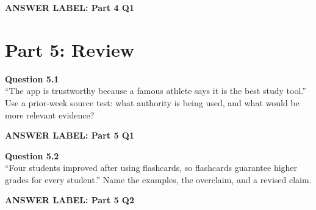 \documentclass[12pt]{article}
\newcommand{\answerbox}[2]{%
\vspace{0.15em}
\noindent\textbf{#1}\par
\vspace{0.05em}
\noindent\fbox{%
\begin{minipage}[t][#2]{\dimexpr\textwidth-2\fboxsep-2\fboxrule}
\rule{\textwidth}{0pt}
\vspace{#2}
\end{minipage}
}\par
\vspace{0.25em}
}
\begin{document}
\answerbox{ANSWER LABEL: Part 4 Q1}{3.2in}

\newpage

\section*{Part 5: Review}

\textbf{Question 5.1}\\[-0.15em]
``The app is trustworthy because a famous athlete says it is the best study tool.'' Use a prior-week source test: what authority is being used, and what would be more relevant evidence?

\answerbox{ANSWER LABEL: Part 5 Q1}{2.2in}

\textbf{Question 5.2}\\[-0.15em]
``Four students improved after using flashcards, so flashcards guarantee higher grades for every student.'' Name the examples, the overclaim, and a revised claim.

\answerbox{ANSWER LABEL: Part 5 Q2}{2.05in}
\end{document}
